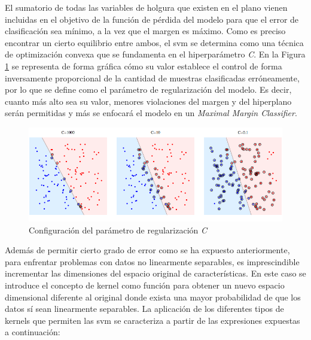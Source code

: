 \vspace{3mm}

El sumatorio de todas las variables de holgura que existen en el plano vienen incluidas en el objetivo de la función de pérdida del modelo para que el error de clasificación sea mínimo, a la vez que el margen es máximo. Como es preciso encontrar un cierto equilibrio entre ambos, el \gls{svm} se determina como una técnica de optimización convexa que se fundamenta en el hiperparámetro \textit{C}. En la Figura \ref{fig:parametroc} se representa de forma gráfica cómo su valor establece el control de forma inversamente proporcional de la cantidad de muestras clasificadas erróneamente, por lo que se define como el parámetro de regularización del modelo. Es decir, cuanto más alto sea su valor, menores violaciones del margen y del hiperplano serán permitidas y más se enfocará el modelo en un \textit{Maximal Margin Classifier}.~\cite{svmciencia}

\vspace{3mm}

\begin{figure}[h!]
    \centering
    \includegraphics[width=1\textwidth]{img/teoria/parametroc.png}
    \caption{Configuración del parámetro de regularización \textit{C} \cite{velocity}}
    \label{fig:parametroc}
\end{figure}

\vspace{3mm}

Además de permitir cierto grado de error como se ha expuesto anteriormente, para enfrentar problemas con datos no linearmente separables, es imprescindible incrementar las dimensiones del espacio original de características. En este caso se introduce el concepto de kernel como función para obtener un nuevo espacio dimensional diferente al original donde exista una mayor probabilidad de que los datos sí sean linearmente separables. La aplicación de los diferentes tipos de kernels que permiten las \gls{svm} se caracteriza a partir de las expresiones expuestas a continuación:~\cite{svmciencia}~\cite{velocity}

